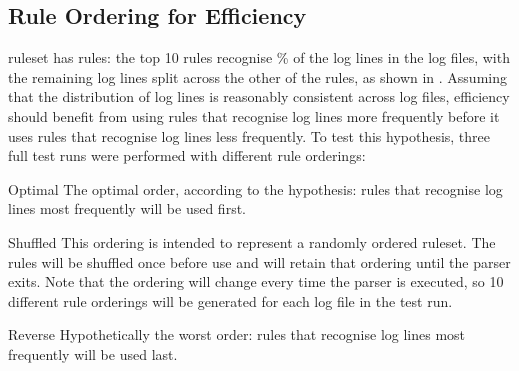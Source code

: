 

\FloatBarrier{}

\subsection{Rule Ordering for Efficiency}

\label{rule ordering for efficiency}

\parsernames{} ruleset has \numberOFrules{} rules: the top 10 rules
recognise \% of the log lines in the
\numberOFlogFILES{} log files, with the remaining log lines split across
the other \numberOFrulesMINUSten{} of the rules, as shown in .  Assuming that the distribution of log lines is reasonably
consistent across log files, \parsernames{} efficiency should benefit from
using rules that recognise log lines more frequently before it uses rules
that recognise log lines less frequently.  To test this hypothesis, three
full test runs were performed with different rule orderings:

\begin{boldeqlist}

    \item [Optimal]  The optimal order, according to the hypothesis: rules
        that recognise log lines most frequently will be used first.

    \item [Shuffled] This ordering is intended to represent a randomly
        ordered ruleset.  The rules will be shuffled once before use and
        will retain that ordering until the parser exits.  Note that the
        ordering will change every time the parser is executed, so 10
        different rule orderings will be generated for each log file in the
        test run.

    \item [Reverse] Hypothetically the worst order: rules that recognise
        log lines most frequently will be used last.

\end{boldeqlist}

